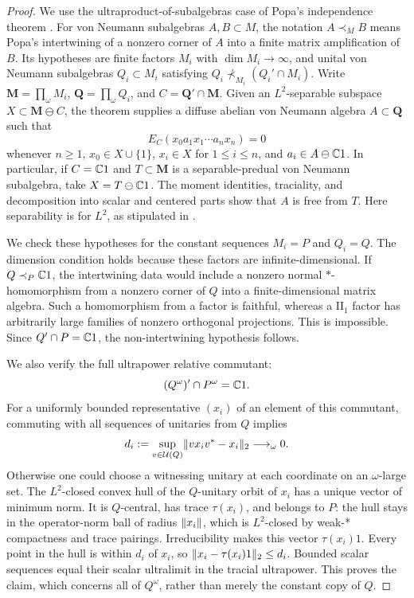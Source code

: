 \begin{proof}
We use the ultraproduct-of-subalgebras case of Popa's independence
theorem \citep[Theorem~0.1(a); see also Theorem~4.3]{Popa2014}.
For von Neumann subalgebras $A,B\subset M$, the notation
$A\prec_M B$ means Popa's intertwining of a nonzero corner of $A$
into a finite matrix amplification of $B$.
Its hypotheses are finite factors \(M_i\) with
\(\dim M_i\longrightarrow\infty\), and unital von Neumann subalgebras
\(Q_i\subset M_i\) satisfying
\(Q_i\nprec_{M_i}(Q_i'\cap M_i)\).  Write
\(\mathbf M=\prod_\omega M_i\), \(\mathbf Q=\prod_\omega Q_i\), and
\(C=\mathbf Q'\cap\mathbf M\).  Given an \(L^2\)-separable subspace
\(X\subset\mathbf M\ominus C\), the theorem supplies a diffuse abelian
von Neumann algebra \(A\subset\mathbf Q\) such that
\[
 E_C(x_0a_1x_1\cdots a_nx_n)=0
\]
whenever \(n\geq1\), \(x_0\in X\cup\{1\}\), \(x_i\in X\) for
\(1\leq i\leq n\), and \(a_i\in A\ominus\mathbb C1\).
In particular, if \(C=\mathbb C1\) and \(T\subset\mathbf M\) is a
separable-predual von Neumann subalgebra, take
\(X=T\ominus\mathbb C1\).  The moment identities, traciality, and decomposition
into scalar and centered parts show that \(A\) is free from \(T\).
Here separability is for \(L^2\), as stipulated in
\citet[Section~1.1]{Popa2014}.

We check these hypotheses for the constant sequences \(M_i=P\) and
\(Q_i=Q\).  The dimension condition holds because these factors are
infinite-dimensional. If \(Q\prec_P\mathbb C1\), the intertwining data
would include a nonzero normal \(*\)-homomorphism from a nonzero
corner of \(Q\) into a finite-dimensional matrix algebra.  Such a
homomorphism from a factor is faithful, whereas a
\(\mathrm{II}_1\) factor has arbitrarily large families of nonzero
orthogonal projections.  This is impossible.  Since \(Q'\cap P=\mathbb C1\),
the non-intertwining hypothesis follows.

We also verify the full ultrapower relative commutant:
\[
                 (Q^\omega)'\cap P^\omega=\mathbb C1.
\]
For a uniformly bounded representative \((x_i)\) of an element of this
commutant, commuting with all sequences of unitaries from \(Q\) implies
\[
 d_i:=\sup_{v\in\mathcal U(Q)}
             \norm{vx_iv^*-x_i}_2\longrightarrow_\omega0.
\]
Otherwise one could choose a witnessing unitary at each coordinate
on an \(\omega\)-large set.  The \(L^2\)-closed convex hull of the
\(Q\)-unitary orbit of \(x_i\) has a unique vector of minimum norm.
It is \(Q\)-central, has trace \(\tau(x_i)\), and belongs to \(P\):
the hull stays in the operator-norm ball of radius \(\lVert x_i\rVert\),
which is \(L^2\)-closed by weak-* compactness and trace pairings.
Irreducibility makes this vector \(\tau(x_i)1\).  Every point in the
hull is within \(d_i\) of \(x_i\), so
\(\lVert x_i-\tau(x_i)1\rVert_2\leq d_i\).  Bounded scalar sequences equal
their scalar ultralimit in the tracial ultrapower.  This proves the
claim, which concerns all of \(Q^\omega\), rather than merely the
constant copy of \(Q\).


\end{proof}
